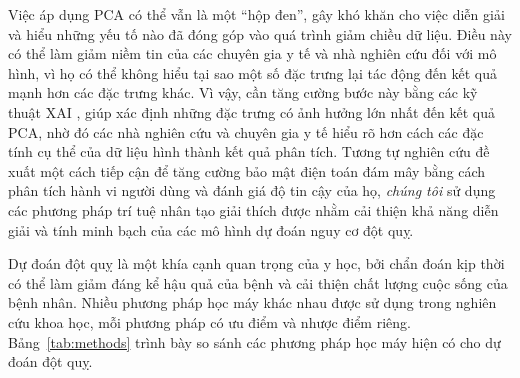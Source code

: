 Việc áp dụng PCA có thể vẫn là một ``hộp đen'', gây khó khăn cho việc diễn giải và hiểu những yếu tố nào đã đóng góp vào quá trình giảm chiều dữ liệu. Điều này có thể làm giảm niềm tin của các chuyên gia y tế và nhà nghiên cứu đối với mô hình, vì họ có thể không hiểu tại sao một số đặc trưng lại tác động đến kết quả mạnh hơn các đặc trưng khác. Vì vậy, cần tăng cường bước này bằng các kỹ thuật XAI , giúp xác định những đặc trưng có ảnh hưởng lớn nhất đến kết quả PCA, nhờ đó các nhà nghiên cứu và chuyên gia y tế hiểu rõ hơn cách các đặc tính cụ thể của dữ liệu hình thành kết quả phân tích. Tương tự nghiên cứu  đề xuất một cách tiếp cận để tăng cường bảo mật điện toán đám mây bằng cách phân tích hành vi người dùng và đánh giá độ tin cậy của họ, \textit{chúng tôi} sử dụng các phương pháp trí tuệ nhân tạo giải thích được nhằm cải thiện khả năng diễn giải và tính minh bạch của các mô hình dự đoán nguy cơ đột quỵ.

Dự đoán đột quỵ là một khía cạnh quan trọng của y học, bởi chẩn đoán kịp thời có thể làm giảm đáng kể hậu quả của bệnh và cải thiện chất lượng cuộc sống của bệnh nhân. Nhiều phương pháp học máy khác nhau được sử dụng trong nghiên cứu khoa học, mỗi phương pháp có ưu điểm và nhược điểm riêng. Bảng~\ref{tab:methods} trình bày so sánh các phương pháp học máy hiện có cho dự đoán đột quỵ.

